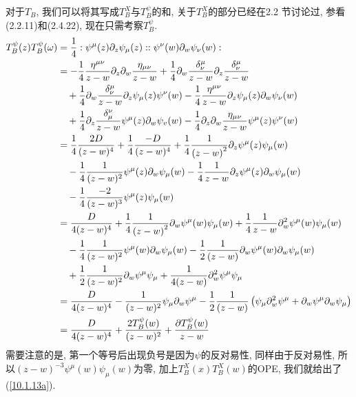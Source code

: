 \begin{tcolorbox}
对于$T_{B}$, 我们可以将其写成$T_{B}^{X}$与$T_{B}^{\psi }$的和, 关于$T_{B}^{X}$的部分已经在2.2%
节讨论过, 参看(2.2.11)和(2.4.22),
现在只需考察$T_{B}^{\psi }$.%
\begin{align*}
T_{B}^{\psi }(z)T_{B}^{\psi }(\omega ) &=\frac{1}{4}:\psi ^{\mu
}(z)\partial _{z}\psi _{\mu }(z)::\psi ^{\nu }(w)\partial _{w}\psi _{\nu
}(w): \\
&=-\frac{1}{4}\frac{\eta ^{\mu \nu }}{z-w}\partial _{z}\partial _{w}\frac{%
\eta _{\mu \nu }}{z-w}+\frac{1}{4}\partial _{w}\frac{\delta _{\nu }^{\mu }}{%
z-w}\partial _{z}\frac{\delta _{\nu }^{\mu }}{z-w} \\
&\quad+\frac{1}{4}\partial _{w}\frac{\delta _{\nu }^{\mu }}{z-w}\partial
_{z}\psi _{\mu }(z)\psi ^{\nu }(w)-\frac{1}{4}\frac{\eta ^{\mu \nu }}{z-w}%
\partial _{z}\psi _{\mu }(z)\partial _{w}\psi _{\nu }(w) \\
&\quad+\frac{1}{4}\partial _{z}\frac{\delta _{\mu }^{\nu }}{z-w}\psi ^{\mu
}(z)\partial _{w}\psi _{v}(w)-\frac{1}{4}\partial _{z}\partial _{w}\frac{%
\eta _{\mu \nu }}{z-w}\psi ^{\mu }(z)\psi ^{\nu }(w) \\
&=\frac{1}{4}\frac{2D}{(z-w)^{4}}+\frac{1}{4}\frac{-D}{(z-w)^{4}}+\frac{1}{4%
}\frac{1}{\left( z-w\right) ^{2}}\partial _{z}\psi ^{\mu }(z)\psi _{\mu }(w)
\\
&\quad-\frac{1}{4}\frac{1}{(z-w)^{2}}\psi ^{\mu }(z)\partial _{w}\psi _{\mu }(w)-%
\frac{1}{4}\frac{1}{z-w}\partial _{z}\psi ^{\mu }(z)\partial _{w}\psi _{\mu
}(w) \\
&\quad-\frac{1}{4}\frac{-2}{(z-w)^{3}}\psi ^{\mu }(z)\psi _{\mu }(w) \\
&=\frac{D}{4(z-w)^{4}}+\frac{1}{4}\frac{1}{\left( z-w\right) ^{2}}\partial
_{w}\psi ^{\mu }(w)\psi _{\mu }(w)+\frac{1}{4}\frac{1}{z-w}\partial
_{w}^{2}\psi ^{\mu }(w)\psi _{\mu }(w) \\
&\quad-\frac{1}{4}\frac{1}{(z-w)^{2}}\psi ^{\mu }(w)\partial _{w}\psi _{\mu }(w)-%
\frac{1}{2}\frac{1}{(z-w)}\partial _{w}\psi ^{\mu }(w)\partial _{w}\psi
_{\mu }(w) \\
&\quad+\frac{1}{2}\frac{1}{(z-w)^{2}}\partial _{w}\psi ^{\mu }\psi _{\mu
} +\frac{1}{4(z-w)}\partial _{w}^{2}\psi ^{\mu }\psi _{\mu } \\
&=\frac{D}{4(z-w)^{4}}-\frac{1}{(z-w)^{2}}\psi _{\mu }\partial _{w}\psi
^{\mu }-\frac{1}{2}\frac{1}{(z-w)}\left( \psi _{\mu }\partial _{w}^{2}\psi
^{\mu }+\partial _{w}\psi ^{\mu }\partial _{w}\psi _{\mu }\right)  \\
&=\frac{D}{4(z-w)^{4}}+\frac{2T_{B}^{\psi }(w)}{(z-w)^{2}}+\frac{\partial
T_{B}^{\psi }(w)}{z-w}
\end{align*}
需要注意的是, 第一个等号后出现负号是因为$ \psi $的反对易性, 同样由于反对易性, 所以$ (z-w)^{-3}\psi^{\mu}(w)\psi_{\mu}(w) $为零, 加上$T_{B}^{X}(x)T_{B}^{X}(w)$的OPE, 我们就给出了(\ref{10.1.13a}).
\end{tcolorbox}

